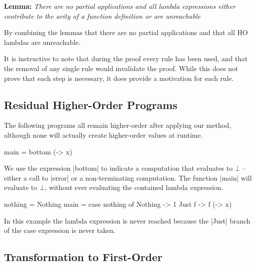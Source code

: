 \documentclass{sigplanconf}
\newenvironment{lemma}[1]
    {\smallskip
     \noindent\textbf{Lemma:} \textit{#1}}
    {\noexample}
\begin{document}
\begin{lemma}{There are no partial applications and all lambda expressions either contribute to the arity of a function definition or are unreachable}

By combining the lemmas that there are no partial applications and that all HO lambdas are unreachable.
\end{lemma}

\smallskip

It is instructive to note that during the proof every rule has been used, and that the removal of any single rule would invalidate the proof. While this does not prove that each step is necessary, it does provide a motivation for each rule.

\subsection{Residual Higher-Order Programs}
\label{sec:example_residual}

The following programs all remain higher-order after applying our method, although none will actually create higher-order values at runtime.

\begin{example}
\begin{code}
main = bottom (\x -> x)
\end{code}

We use the expression |bottom| to indicate a computation that evaluates to $\bot{}$ -- either a call to |error| or a non-terminating computation. The function |main| will evaluate to $\bot{}$, without ever evaluating the contained lambda expression.
\end{example}

\begin{example}
\begin{onepage}
\begin{code}
nothing = Nothing
main = case  nothing of
             Nothing  -> 1
             Just f   -> f (\x -> x)
\end{code}
\end{onepage}

In this example the lambda expression is never reached because the |Just| branch of the case expression is never taken.
\end{example}

\subsection{Transformation to First-Order}
\label{sec:consequences}
\end{document}
